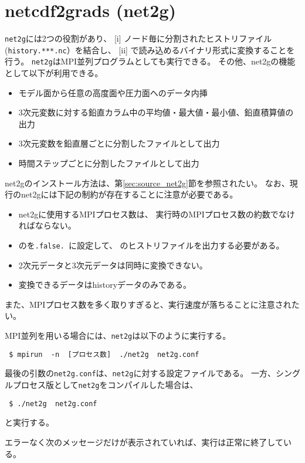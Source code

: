 \section{netcdf2grads (net2g)} \label{sec:net2g}

\verb|net2g|には2つの役割があり、
[i] ノード毎に分割されたヒストリファイル(\verb|history.***.nc|）を結合し、
[ii] {\grads}で読み込めるバイナリ形式に変換することを行う。
\verb|net2g|はMPI並列プログラムとしても実行できる。
その他、net2gの機能として以下が利用できる。
%
\begin{itemize}
 \item モデル面から任意の高度面や圧力面へのデータ内挿
 \item 3次元変数に対する鉛直カラム中の平均値・最大値・最小値、鉛直積算値の出力
 \item 3次元変数を鉛直層ごとに分割したファイルとして出力
 \item 時間ステップごとに分割したファイルとして出力
\end{itemize}

net2gのインストール方法は、第\ref{sec:source_net2g}節を参照されたい。
なお、現行のnet2gには下記の制約が存在することに注意が必要である。
\begin{itemize}
 \item net2gに使用するMPIプロセス数は、
\scalerm 実行時のMPIプロセス数の約数でなければならない。
\item {}のを\verb|.false. |に設定して、
\scalerm のヒストリファイルを出力する必要がある。
 \item 2次元データと3次元データは同時に変換できない。
 \item 変換できるデータはhistoryデータのみである。
\end{itemize}
また、MPIプロセス数を多く取りすぎると、実行速度が落ちることに注意されたい。


MPI並列を用いる場合には、\verb|net2g|は以下のように実行する。
\begin{verbatim}
 $ mpirun  -n  [プロセス数]  ./net2g  net2g.conf
\end{verbatim}
最後の引数の\verb|net2g.conf|は、\verb|net2g|に対する設定ファイルである。
一方、シングルプロセス版として\verb|net2g|をコンパイルした場合は、
\begin{verbatim}
 $ ./net2g  net2g.conf
\end{verbatim}
と実行する。

エラーなく次のメッセージだけが表示されていれば、実行は正常に終了している。\\

